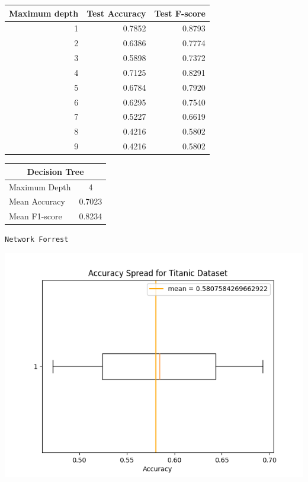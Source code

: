 \documentclass{article}
\begin{document}
\begin{minipage}{0.49\textwidth}
    \centering
    \begin{tabular}{rrr}
        \toprule
        Maximum depth & Test Accuracy & Test F-score \\
        \midrule
        1 & {0.7852} & {0.8793} \\
        2 & {0.6386} & {0.7774} \\
        3 & {0.5898} & {0.7372} \\
        4 & {0.7125} & {0.8291} \\
        5 & {0.6784} & {0.7920} \\
        6 & {0.6295} & {0.7540} \\
        7 & {0.5227} & {0.6619} \\
        8 & {0.4216} & {0.5802} \\
        9 & {0.4216} & {0.5802} \\
        \bottomrule
    \end{tabular}


    \vspace*{30pt}
    \begin{tabular}{lc}
        \toprule
        \multicolumn{2}{c}{Decision Tree} \\
        \midrule
        Maximum Depth & 4 \\
        Mean Accuracy & 0.7023 \\
        Mean F1-score & 0.8234 \\
        \bottomrule
    \end{tabular}
\end{minipage}
\restoregeometry
\begin{center}
    \texttt{Network Forrest}
\end{center}
\begin{minipage}{0.49\textwidth}
    \centering
    \includegraphics*[width=\textwidth]{./src/figures/Titanic Dataset_variant.png}
\end{minipage}
\end{document}
